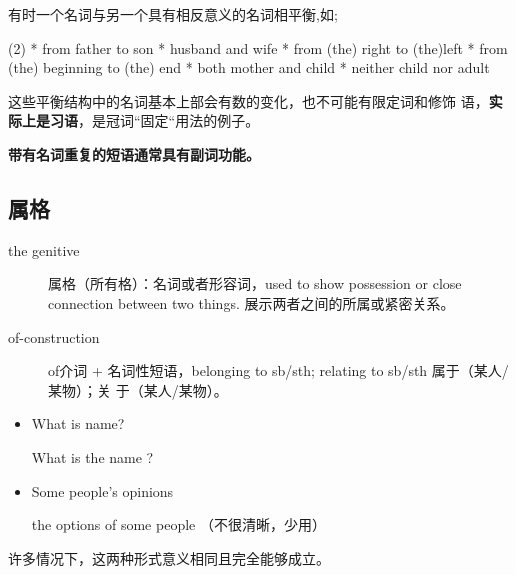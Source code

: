 有时一个名词与另一个具有相反意义的名词相平衡,如;
\begin{taskitem}(2)
* from father to son
* husband and wife
* from (the) right to (the)left
* from (the) beginning to (the) end
* both mother and child
* neither child nor adult
\end{taskitem}

这些平衡结构中的名词基本上部会有数的变化，也不可能有限定词和修饰
语，\textbf{实际上是习语}，是冠词“固定“用法的例子。



\textbf{带有名词重复的短语通常具有副词功能。}

\subsection{属格}

\begin{description}
\item[the genitive] 属格（所有格）：名词或者形容词，used to show possession or
  close connection between two things. 展示两者之间的所属或紧密关系。
\item[of-construction] of介词 + 名词性短语，belonging to sb/sth; relating to sb/sth 属于（某人/某物）；关
  于（某人/某物）。
\end{description}

\begin{itemize}
\item What is  name?

  What is the name ?

\item Some people's opinions

  the options of some people （不很清晰，少用）
\end{itemize}
许多情况下，这两种形式意义相同且完全能够成立。


